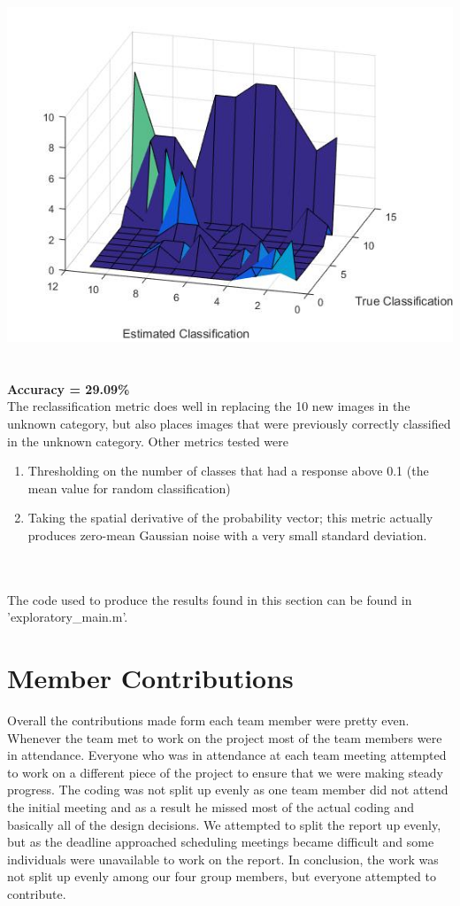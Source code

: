\documentclass[11pt,english]{article}
\begin{document}
\includegraphics[scale=0.6]{confexp}
~\\~\\
\textbf{Accuracy = 29.09\%}
\\
The reclassification metric does well in replacing the 10 new images in the unknown category, but also places images that were previously correctly classified in the unknown category.  Other metrics tested were
\begin{enumerate}
\item Thresholding on the number of classes that had a response above 0.1 (the mean value for random classification)
\item Taking the spatial derivative of the probability vector; this metric actually produces zero-mean Gaussian noise with a very small standard deviation.
\end{enumerate}

~\\~\\
The code used to produce the results found in this section can be found in 'exploratory\_main.m'.

\section{Member Contributions}
	Overall the contributions made form each team member were pretty even. Whenever the team met to work on the project most of the team members were in attendance. Everyone who was in attendance at each team meeting attempted to work on a different piece of the project to ensure that we were making steady progress. The coding was not split up evenly as one team member did not attend the initial meeting and as a result he missed most of the actual coding and basically all of the design decisions. We attempted to split the report up evenly, but as the deadline approached scheduling meetings became difficult and some individuals were unavailable to work on the report. In conclusion, the work was not split up evenly among our four group members, but everyone attempted to contribute.
\end{document}
